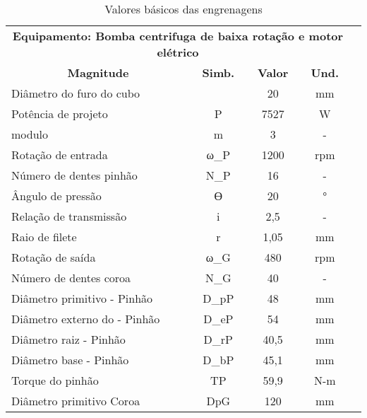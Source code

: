 \begin{table}[]
\centering
\caption{\label{tab:3} Valores básicos das engrenagens}
\begin{tabular}{l c c c c}
\hline
\multicolumn{4}{c}{\textbf{Equipamento: Bomba centrifuga de baixa rotação e motor elétrico}} \\
\multicolumn{1}{c}{\textbf{Magnitude}}  & \textbf{Simb.}  & \textbf{Valor}  & \textbf{Und.}  \\
Diâmetro do furo do cubo                &                & 20              & mm             \\
Potência de projeto                     & P               & 7527            & W              \\
modulo                                  & m               & 3               & -              \\
Rotação de entrada                      & ω_P              & 1200            & rpm            \\
Número de dentes pinhão                 & N_P              & 16              & -              \\
Ângulo de pressão                       & ϴ              & 20              & °              \\
Relação de transmissão                  & i               & 2,5             & -              \\
Raio de filete                          & r               & 1,05            & mm             \\
Rotação de saída                        & ω_G              & 480             & rpm            \\
Número de dentes coroa                  & N_G              & 40              & -              \\
Diâmetro primitivo - Pinhão             & D_pP             & 48              & mm             \\
Diâmetro externo do - Pinhão            & D_eP             & 54              & mm             \\
Diâmetro raiz - Pinhão                  & D_rP             & 40,5            & mm             \\
Diâmetro base - Pinhão                  & D_bP             & 45,1            & mm             \\
Torque do pinhão                        & TP              & 59,9            & N-m            \\
Diâmetro primitivo Coroa                & DpG             & 120             & mm             \\

\end{tabular}
\end{table}
